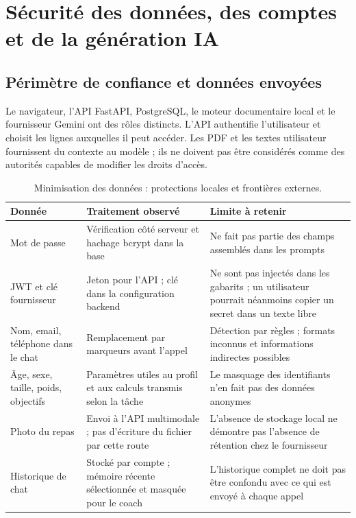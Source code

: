 \clearpage
\section{Sécurité des données, des comptes et de la génération IA}
\label{sec:securite-ia}
\subsection{Périmètre de confiance et données envoyées}
Le navigateur, l'API FastAPI, PostgreSQL, le moteur documentaire local et le fournisseur Gemini ont des rôles distincts. L'API authentifie l'utilisateur et choisit les lignes auxquelles il peut accéder. Les PDF et les textes utilisateur fournissent du contexte au modèle ; ils ne doivent pas être considérés comme des autorités capables de modifier les droits d'accès.

\begin{table}[H]
\small
\begin{tabularx}{\linewidth}{p{3.2cm}XX}
\toprule
\textbf{Donnée} & \textbf{Traitement observé} & \textbf{Limite à retenir} \\
\midrule
Mot de passe & Vérification côté serveur et hachage bcrypt dans la base & Ne fait pas partie des champs assemblés dans les prompts \\
JWT et clé fournisseur & Jeton pour l'API ; clé dans la configuration backend & Ne sont pas injectés dans les gabarits ; un utilisateur pourrait néanmoins copier un secret dans un texte libre \\
Nom, email, téléphone dans le chat & Remplacement par marqueurs avant l'appel & Détection par règles ; formats inconnus et informations indirectes possibles \\
Âge, sexe, taille, poids, objectifs & Paramètres utiles au profil et aux calculs transmis selon la tâche & Le masquage des identifiants n'en fait pas des données anonymes \\
Photo du repas & Envoi à l'API multimodale ; pas d'écriture du fichier par cette route & L'absence de stockage local ne démontre pas l'absence de rétention chez le fournisseur \\
Historique de chat & Stocké par compte ; mémoire récente sélectionnée et masquée pour le coach & L'historique complet ne doit pas être confondu avec ce qui est envoyé à chaque appel \\
\bottomrule
\end{tabularx}
\caption{Minimisation des données : protections locales et frontières externes.}
\end{table}

